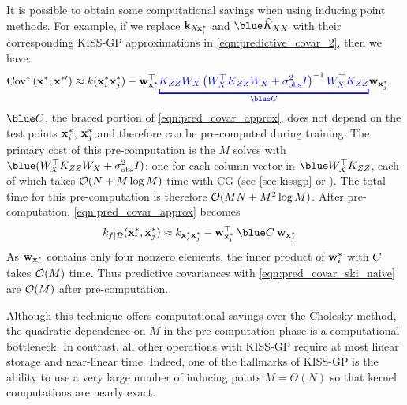 It is possible to obtain some computational savings when using inducing point methods.
For example, if we replace $\mathbf{k}_{X \! \mathbf{x}^*_i}$ and $\blue \trainK$ with their corresponding KISS-GP approximations in \cref{eqn:predictive_covar_2}, then we have:
%
\begin{align}
  \covtest{\bxtest}{\bxtestprime}
  &\approx
  k(\bxtest_i \bxtest_j) -
  \bw_{\bxtest_i}^{\top} {\color{blue}\underbracket{{\bK_{\bZ\bZ} \bW_{\bX} \left( \bW^\top_{\bX} \bK_{\bZ\bZ} \bW_\bX + \sigma^2_\text{obs} \bI \right)^{-1} \bW^\top_{\bX} \bK_{\bZ \bZ}}}_{\blue \bC}} \bw_{\bxtest_j}.
  \label{eqn:pred_covar_approx}
\end{align}
%
$\blue \bC$, the braced portion of \eqref{eqn:pred_covar_approx}, does not depend on the test points $\mathbf{x}^*_{i}$, $\mathbf{x}^*_{j}$ and therefore can be pre-computed during training.
The primary cost of this pre-computation is the $M$ solves with $\blue (\bW_\bX^\top {\bK}_{\bZ\bZ} \bW_\bX + \sigma_\text{obs}^2 \bI)$: one for each column vector in $\blue \bW^{\top}_{\bX} \bK_{\bZ\bZ}$, each of which takes $\bigo{N + M\log M}$ time with CG (see \cref{sec:kissgp} or \citet{wilson2015kernel}).
The total time for this pre-computation is therefore $\bigo{MN + M^2 \log M}$.
After pre-computation, \cref{eqn:pred_covar_approx} becomes
%
\begin{align}
  k_{f\mid\dset}(\bxtest_i, \bxtest_j) &\approx k_{\bxtest_i \bxtest_j} - \bw_{\bxtest_i}^\top \: {\blue \bC} \: \bw_{\bxtest_j}
    \label{eqn:pred_covar_ski_naive}
\end{align}
As $\mathbf{w}_{\mathbf{x}^*_i}$ contains only four nonzero elements, the inner product of $\mathbf{w}^{*}_{i}$ with $C$ takes $\bigo{M}$ time.
Thus predictive covariances with \cref{eqn:pred_covar_ski_naive} are $\bigo{M}$ after pre-computation.

Although this technique offers computational savings over the Cholesky method, the quadratic dependence on $M$ in the pre-computation phase is a computational bottleneck.
In contrast, all other operations with KISS-GP require at most linear storage and near-linear time.
Indeed, one of the hallmarks of KISS-GP is the ability to use a very large number of inducing points $M = \Theta(N)$ so that kernel computations are nearly exact.

